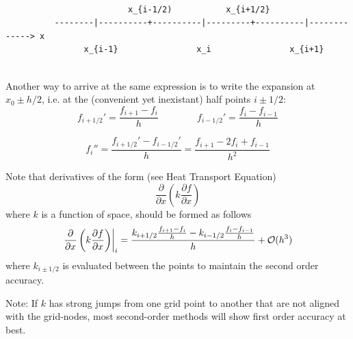 \begin{verbatim}

                         x_{i-1/2)           x_{i+1/2}
          --------|----------+----------|---------+----------|-------------> x
                x_{i-1}                x_i                x_{i+1}


\end{verbatim}
Another way to arrive at the same expression is to write the expansion at $x_0 \pm h/2$, 
i.e. at the (convenient yet inexistant) half points $i\pm 1/2$:
\[
f_{i+1/2}'=\frac{f_{i+1}-f_i}{h}
\quad\quad
\quad\quad
f_{i-1/2}'=\frac{f_{i}-f_{i-1}}{h}
\]
\begin{mdframed}[backgroundcolor=blue!5]
\[
f_i''=\frac{f_{i+1/2}'-f_{i-1/2}'}{h} = 
\frac{f_{i+1}-2f_i+f_{i-1}}{h^2} 
\]
\end{mdframed}
Note that derivatives of the form (see Heat Transport Equation) 
\[
\frac{\partial }{\partial x} \left(  k  \frac{\partial f}{\partial x} \right)
\]
where $k$ is a function of space, should be formed as follows
\[
\left. \frac{\partial }{\partial x} \left(  k  \frac{\partial f}{\partial x} \right) \right|_i
=
\frac{ k_{i+1/2} \frac{f_{i+1}-f_i}{h} - k_{i-1/2}\frac{f_i-f_{i-1}}{h}    }{h} + {\cal O}(h^3)
\]
where $k_{i\pm 1/2}$ is evaluated between the points to maintain the second order accuracy.

{\tiny
Note: If $k$ has strong jumps from one grid point to another that are not aligned with
the grid-nodes, most second-order methods will show first order accuracy at best.}
















